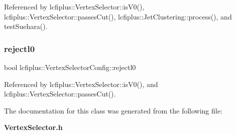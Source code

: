 Referenced by lcfiplus\+::\+Vertex\+Selector\+::is\+V0(), lcfiplus\+::\+Vertex\+Selector\+::passes\+Cut(), lcfiplus\+::\+Jet\+Clustering\+::process(), and test\+Suehara().

\mbox{\label{classlcfiplus_1_1VertexSelectorConfig_a73a2c1780bcbe3a7bdd867b7717da57f}} 
\subsubsection{rejectl0}
{\footnotesize\ttfamily bool lcfiplus\+::\+Vertex\+Selector\+Config\+::rejectl0}



Referenced by lcfiplus\+::\+Vertex\+Selector\+::is\+V0(), and lcfiplus\+::\+Vertex\+Selector\+::passes\+Cut().



The documentation for this class was generated from the following file\+:\begin{DoxyCompactItemize}
\item 
\textbf{ Vertex\+Selector.\+h}\end{DoxyCompactItemize}
